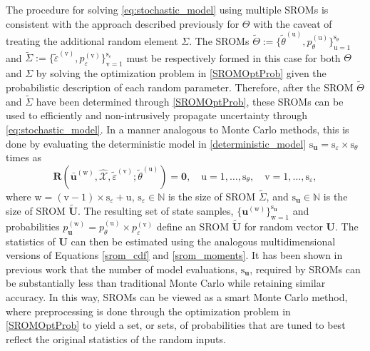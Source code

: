 The procedure for solving \eqref{eq:stochastic_model} using multiple SROMs is consistent with the approach described previously for $\Theta$ with the caveat of treating the additional random element $\Sigma$. The
SROMs $\tilde{\Theta}:=\{ \tilde{\theta}^{(\mathrm{u})}, p_{\theta}^{(\mathrm{u})} \}_{\mathrm{u}=1}^{\mathrm{s}_{\theta}}$ and $\tilde{\Sigma}:=\{ \tilde{\varepsilon}^{(\mathrm{v})}, p_{\varepsilon}^{(\mathrm{v})} \}_{\mathrm{v}=1}^{\mathrm{s}_{\varepsilon}}$ must be respectively formed in this case for both $\Theta$ and $\Sigma$ by solving the optimization problem in \eqref{SROMOptProb} given the probabilistic description of each random parameter. Therefore, after the SROM $\tilde{\Theta}$ and $\tilde{\Sigma}$ have been determined through \eqref{SROMOptProb}, these SROMs can be used to efficiently and non-intrusively propagate uncertainty through \eqref{eq:stochastic_model}. In a manner analogous to Monte Carlo methods, this is done by evaluating the deterministic model in \eqref{deterministic_model} $\mathrm{s}_{\bm u} = \mathrm{s}_{\varepsilon} \times \mathrm{s}_{\theta}$ times as
\begin{equation}
\bm{R} (\bar{\bm u}^{(\mathrm{w})}, \widehat{\mathcal{X}}, \tilde\varepsilon^{(\mathrm{v})};  \tilde{\theta}^{(\mathrm{u})}) = \bm 0, \quad \mathrm{u} = 1,\dots,\mathrm{s}_{\theta},\quad \mathrm{v} = 1,\dots,\mathrm{s}_{\varepsilon},   \label{srom_model}
\end{equation}
where $\mathrm{w}=(\mathrm{v}-1)\times\mathrm{s}_{\varepsilon}+\mathrm{u}$, $\mathrm{s}_{\varepsilon}\in\mathbb{N}$ is the size of SROM $\tilde\Sigma$, and $\mathrm{s}_{\bm u}\in\mathbb{N}$ is the size of SROM $\tilde{\bm U}$. The resulting set of state samples, $\{ \bm u^{(\mathrm{w})} \}_{\mathrm{w}=1}^{\mathrm{s}_{\bm u}}$ and probabilities $p^{(\mathrm{w})}_{\bm u} = p_{\theta}^{(\mathrm{u})} \times p_{\varepsilon}^{(\mathrm{v})}$ define an SROM $\tilde{\bm U}$ for random vector $\bm U$. The statistics of $\bm U$ can then be estimated using the analogous multidimensional versions of Equations \eqref{srom_cdf} and \eqref{srom_moments}. It has been shown in previous work \cite{warner2013stochastic, sarkar2014stochastic} that the number of model evaluations, $\mathrm{s}_{\bm u}$, required by SROMs can be substantially less than traditional Monte Carlo while retaining similar accuracy. In this way, SROMs can be viewed as a smart Monte Carlo method, where preprocessing is done through the optimization problem in \eqref{SROMOptProb} to yield a set, or sets, of probabilities that are tuned to best reflect the original statistics of the random inputs.  

